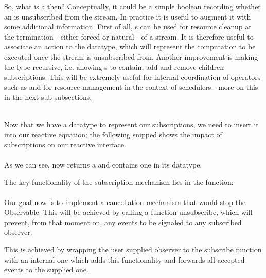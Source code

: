 So, what is a  then? Conceptually, it could be a simple boolean recording whether an  is unsubscribed from the stream. In practice it is useful to augment it with some additional information. First of all, s can be used for resource cleanup at the termination - either forced or natural - of a stream. It is therefore useful to associate an  action to the datatype, which will represent the computation to be executed once the stream is unsubscribed from. Another improvement is making the type recursive, i.e. allowing s to contain, add and remove children subscriptions. This will be extremely useful for internal coordination of operators such as \code{(>>=)} and for resource management in the context of schedulers - more on this in the next sub-subsections.



\\

Now that we have a datatype to represent our subscriptions, we need to insert it into our reactive equation; the following snipped shows the impact of subscriptions on our reactive interface.\\

\\

As we can see,  now returns a  and  contains one in its datatype.

The key functionality of the subscription mechanism lies in the  function:\\

\\

Our goal now is to implement a cancellation mechanism that would stop the Observable. This will be achieved by calling a function unsubscribe, which will prevent, from that moment on, any events to be signaled to any subscribed observer.

This is achieved by wrapping the user supplied observer to the subscribe function with an internal one which adds this functionality and forwards all accepted events to the supplied one.


